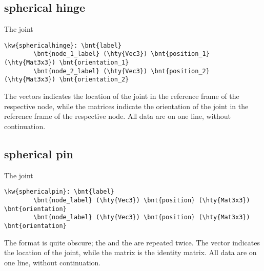 \begin{comment}
\subsection{rod bezier}
The \kw{rod bezier} joint
\begin{Verbatim}[commandchars=\\\{\}]
	\kw{rod bezier}: \bnt{label}
		\bnt{node_1_label} (\hty{Vec3}) \bnt{relative_offset_1} (\hty{Vec3}) \bnt{relative_offset_2}
		\bnt{node_2_label} (\hty{Vec3}) \bnt{relative_offset_3} (\hty{Vec3}) \bnt{relative_offset_4}
\end{Verbatim}
The \nt{label} of the joint, followed by the label of node 1, 
followed by the offsets 1 and 2 (in the reference frame of the
node) and the same for node 2 and offsets 3 and 4.
All data are on one line, without continuation.
\end{comment}
\subsection{spherical hinge}
The  joint
\begin{Verbatim}[commandchars=\\\{\}]
    \kw{sphericalhinge}: \bnt{label}
        \bnt{node_1_label} (\hty{Vec3}) \bnt{position_1} (\hty{Mat3x3}) \bnt{orientation_1}
        \bnt{node_2_label} (\hty{Vec3}) \bnt{position_2} (\hty{Mat3x3}) \bnt{orientation_2}
\end{Verbatim}
The  vectors indicates the location of the joint
in the reference frame of the respective node,
while the  matrices indicate the orientation of the joint
in the reference frame of the respective node.
All data are on one line, without continuation.

\subsection{spherical pin}
The  joint
\begin{Verbatim}[commandchars=\\\{\}]
    \kw{sphericalpin}: \bnt{label}
        \bnt{node_label} (\hty{Vec3}) \bnt{position} (\hty{Mat3x3}) \bnt{orientation}
        \bnt{node_label} (\hty{Vec3}) \bnt{position} (\hty{Mat3x3}) \bnt{orientation}
\end{Verbatim}
The format is quite obscure; the  and the 
are repeated twice.
The vector  indicates the location of the joint,
while the matrix  is the identity matrix.
All data are on one line, without continuation.

